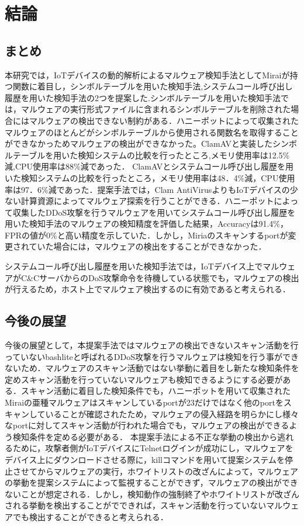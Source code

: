 \chapter{結論}

\section{まとめ}
本研究では，IoTデバイスの動的解析によるマルウェア検知手法としてMiraiが持つ関数に着目し，シンボルテーブルを用いた検知手法,システムコール呼び出し履歴を用いた検知手法の2つを提案した.シンボルテーブルを用いた検知手法では，マルウェアの実行形式ファイルに含まれるシンボルテーブルを削除された場合にはマルウェアの検出できない制約がある．ハニーポットによって収集されたマルウェアのほとんどがシンボルテーブルから使用される関数名を取得することができなかっためマルウェアの検出ができなかった。ClamAVと実装したシンボルテーブルを用いた検知システムの比較を行ったところ,メモリ使用率は12.5\%減,CPU使用率は88\%減であった．
ClamAVとシステムコール呼び出し履歴を用いた検知システムの比較を行ったところ，メモリ使用率は48．4\%減，CPU使用率は97．6\%減であった．提案手法では，Clam AntiVirusよりもIoTデバイスの少ない計算資源によってマルウェア探索を行うことができる．ハニーポットによって収集したDDoS攻撃を行うマルウェアを用いてシステムコール呼び出し履歴を用いた検知手法のマルウェアの検知精度を評価した結果，Accuracyは91.4\%，FPRの値が0\%と高い精度を示していた．しかし，Miriaのスキャンするportが変更されていた場合には，マルウェアの検出をすることができなかった．\par
システムコール呼び出し履歴を用いた検知手法では，IoTデバイス上でマルウェアがC\&CサーバからのDoS攻撃命令を待機している状態でも，マルウェアの検出が行えるため，ホスト上でマルウェア検出するのに有効であると考えられる．

\section{今後の展望}
今後の展望として，本提案手法ではマルウェアの検出できないスキャン活動を行っていないbashliteと呼ばれるDDoS攻撃を行うマルウェアは検知を行う事ができないため．マルウェアのスキャン活動ではない挙動に着目をし新たな検知条件を定めスキャン活動を行っていないマルウェアも検知できるようにする必要がある．スキャン活動に着目した検知条件でも，ハニーポットを用いて収集されたMiraiの亜種マルウェアはスキャンしているportが23だけではなく他のportをスキャンしていることが確認されたため，マルウェアの侵入経路を明らかにし様々なportに対してスキャン活動が行われた場合でも，マルウェアの検出ができるよう検知条件を定める必要がある．
本提案手法による不正な挙動の検出から逃れるために，攻撃者側がIoTデバイスにTelnetログインが成功にし，マルウェアをデバイス上にダウンロードさせる際に，killコマンドを用いて提案システムを停止させてからマルウェアの実行，ホワイトリストの改ざんによって，マルウェアの挙動を提案システムによって監視することができず，マルウェアの検出ができないことが想定される．しかし，検知動作の強制終了やホワイトリストが改ざんされる挙動を検出することがでできれば，スキャン活動を行っていないマルウェアでも検出することができると考えられる．

